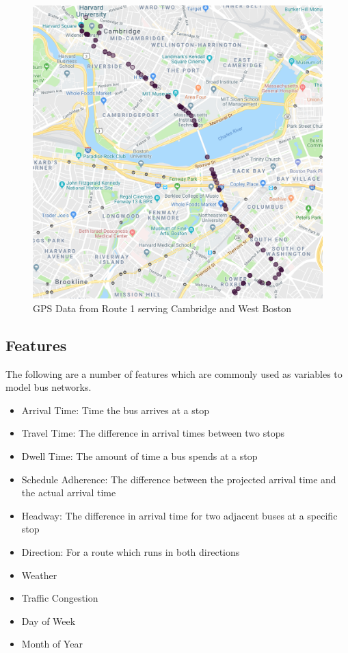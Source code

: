 \begin{figure}
\includegraphics[width=\linewidth]{images/map.png}
\caption{GPS Data from Route 1 serving Cambridge and West Boston}
\label{gps}
\end{figure}

\subsection{Features}

The following are a number of features which are commonly used as variables to model bus networks.

\begin{itemize}
  \item Arrival Time: Time the bus arrives at a stop
  \item Travel Time: The difference in arrival times between two stops
  \item Dwell Time: The amount of time a bus spends at a stop
  \item Schedule Adherence: The difference between the projected arrival time and the actual arrival time
  \item Headway: The difference in arrival time for two adjacent buses at a specific stop
  \item Direction: For a route which runs in both directions
  \item Weather
  \item Traffic Congestion
  \item Day of Week
  \item Month of Year
\end{itemize}

